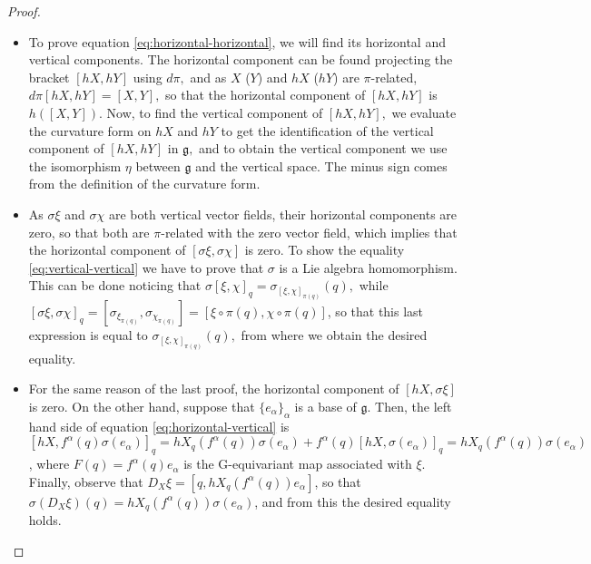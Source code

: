 \documentclass[12pt, letterpaper, reqno]{amsart}
\theoremstyle{definition}
\theoremstyle{plain}
\theoremstyle{remark}
\begin{document}
\begin{proof}

	\begin{itemize}
		\item To prove equation \eqref{eq:horizontal-horizontal}, we will find its horizontal and vertical components. The horizontal component can be found projecting the bracket $ [hX,hY] $ using $ d\pi, $ and as $ X $ ($ Y $) and $ hX $ ($hY$)   are $ \pi $-related, $ d\pi[hX, hY]=[X,Y], $ so that the horizontal component of $ [hX,hY] $ is $ h([X,Y]) $. Now, to find the vertical component of $ [hX,hY], $ we evaluate the curvature form on $ hX $ and $ hY $ to get the identification of the vertical component of $ [hX,hY] $ in $ \mathfrak{g}, $ and to obtain the vertical component we use the isomorphism $ \eta $ between $ \mathfrak{g} $ and the vertical space. The minus sign comes from the definition of the curvature form.

		\item As $ \sigma \xi $ and $ \sigma\chi $ are both vertical vector fields, their horizontal components are zero, so that both are $ \pi $-related with the zero vector field, which implies that the horizontal component of $ [\sigma\xi, \sigma\chi] $ is zero. To show the equality \eqref{eq:vertical-vertical} we have to prove that $ \sigma $ is a Lie algebra homomorphism. This can be done noticing that $ \sigma[\xi, \chi]_q = \sigma_{[\xi,\chi]_{\pi(q)}}(q), $  while $ [\sigma\xi,\sigma\chi]_q = [\sigma_{\xi_{\pi(q)}}, \sigma_{\chi_{\pi(q)}}] =[\xi\circ\pi(q),\chi\circ\pi(q)] $, so that this last expression is equal to $ \sigma_{[\xi, \chi]_{\pi(q)}}(q), $ from where we obtain the desired equality.

		\item For the same reason of the last proof, the horizontal component of $ [hX,\sigma \xi] $ is zero. On the other hand, suppose that $ \{e_\alpha\}_\alpha $ is a base of $ \mathfrak{g}.  $ Then, the left hand side of equation \eqref{eq:horizontal-vertical} is $[hX, f^\alpha(q) \sigma(e_\alpha)]_q = hX_q (f^\alpha(q))\sigma(e_\alpha) + f^\alpha(q) [hX, \sigma(e_\alpha)]_q = hX_q (f^\alpha(q))\sigma(e_\alpha)$, where $ F(q) = f^\alpha(q)e_\alpha $ is the G-equivariant map associated with $ \xi $. Finally, observe that $D_X\xi= [q,  hX_q (f^\alpha(q))e_\alpha]$, so that $\sigma(D_X\xi)(q) = hX_q (f^\alpha(q))\sigma(e_\alpha) $, and from this the desired equality holds. 
	\end{itemize}
\end{proof}
\end{document}
